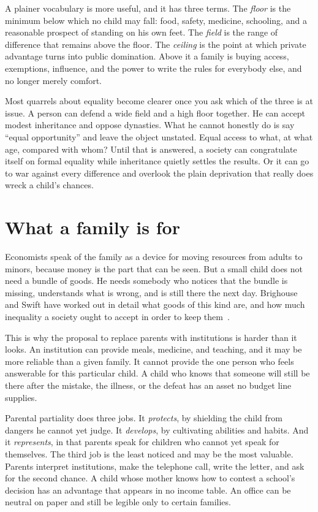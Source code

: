 \documentclass[12pt,a4paper]{book}
\begin{document}
A plainer vocabulary is more useful, and it has three terms. The \emph{floor} is the minimum below which no child may fall: food, safety, medicine, schooling, and a reasonable prospect of standing on his own feet. The \emph{field} is the range of difference that remains above the floor. The \emph{ceiling} is the point at which private advantage turns into public domination. Above it a family is buying access, exemptions, influence, and the power to write the rules for everybody else, and no longer merely comfort.

Most quarrels about equality become clearer once you ask which of the three is at issue. A person can defend a wide field and a high floor together. He can accept modest inheritance and oppose dynasties. What he cannot honestly do is say ``equal opportunity'' and leave the object unstated. Equal access to what, at what age, compared with whom? Until that is answered, a society can congratulate itself on formal equality while inheritance quietly settles the results. Or it can go to war against every difference and overlook the plain deprivation that really does wreck a child's chances.

\section{What a family is for}

Economists speak of the family as a device for moving resources from adults to minors, because money is the part that can be seen. But a small child does not need a bundle of goods. He needs somebody who notices that the bundle is missing, understands what is wrong, and is still there the next day. Brighouse and Swift have worked out in detail what goods of this kind are, and how much inequality a society ought to accept in order to keep them~\cite{BrighouseSwift2014}.

This is why the proposal to replace parents with institutions is harder than it looks. An institution can provide meals, medicine, and teaching, and it may be more reliable than a given family. It cannot provide the one person who feels answerable for this particular child. A child who knows that someone will still be there after the mistake, the illness, or the defeat has an asset no budget line supplies.

Parental partiality does three jobs. It \emph{protects}, by shielding the child from dangers he cannot yet judge. It \emph{develops}, by cultivating abilities and habits. And it \emph{represents}, in that parents speak for children who cannot yet speak for themselves. The third job is the least noticed and may be the most valuable. Parents interpret institutions, make the telephone call, write the letter, and ask for the second chance. A child whose mother knows how to contest a school's decision has an advantage that appears in no income table. An office can be neutral on paper and still be legible only to certain families.
\end{document}
